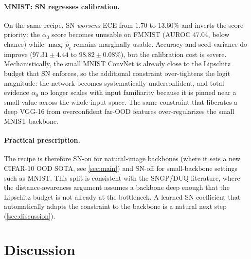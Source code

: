 \documentclass[review,5p,times]{elsarticle}
\begin{document}
\paragraph{MNIST: SN regresses calibration.} On the same recipe, SN
\emph{worsens} ECE from $1.70$ to $13.60\%$ and inverts the score
priority: the $\alpha_0$ score becomes unusable on FMNIST (AUROC
$47.04$, below chance) while $\max_c\hat p_c$ remains marginally usable.
Accuracy and seed-variance do improve ($97.31\!\pm\!4.44$ to
$98.82\!\pm\!0.08\%$), but the calibration cost is severe.
Mechanistically, the small MNIST ConvNet is already close to the
Lipschitz budget that SN enforces, so the additional constraint
over-tightens the logit magnitude: the network becomes systematically
underconfident, and total evidence $\alpha_0$ no longer scales with
input familiarity because it is pinned near a small value across the
whole input space. The same constraint that liberates a deep VGG-16 from
overconfident far-OOD features over-regularizes the small MNIST backbone.

\paragraph{Practical prescription.} The recipe is therefore SN-on for
natural-image backbones (where it sets a new CIFAR-10 OOD SOTA, see
\autoref{sec:main}) and SN-off for small-backbone settings such as MNIST.
This split is consistent with the SNGP/DUQ literature, where the
distance-awareness argument assumes a backbone deep enough that the
Lipschitz budget is not already at the bottleneck. A learned SN
coefficient that automatically adapts the constraint to the backbone is
a natural next step (\autoref{sec:discussion}).

\section{Discussion}\label{sec:discussion}
\end{document}
